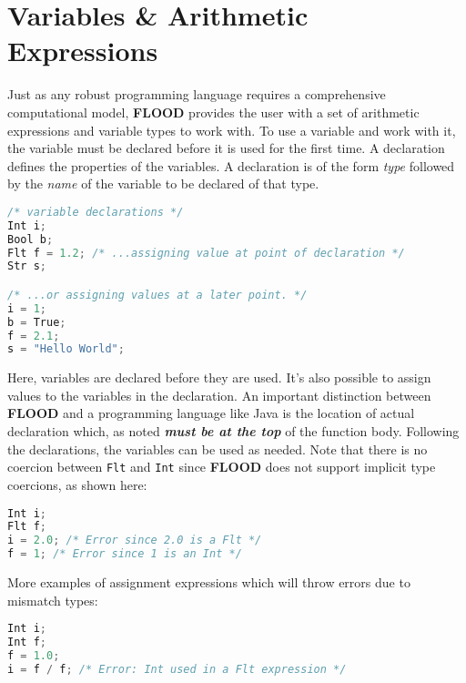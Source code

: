 \documentclass[12pt]{report}
\begin{document}
\section{Variables \& Arithmetic Expressions}

Just as any robust programming language requires a comprehensive computational model, \textbf{FLOOD} provides the user with a set of arithmetic expressions and variable types to work with. To use a variable and work with it, the variable must be declared before it is used for the first time. A declaration defines the properties of the variables. A declaration is of the form \textit{type} followed by the \textit{name} of the variable to be declared of that type.

\begin{singlespace}
\begin{lstlisting}[language=Java,label=some-code,caption=Variable declarations]
/* variable declarations */
Int i;
Bool b;
Flt f = 1.2; /* ...assigning value at point of declaration */
Str s;

/* ...or assigning values at a later point. */
i = 1;
b = True;
f = 2.1;
s = "Hello World";
\end{lstlisting}
\end{singlespace}

Here, variables are declared before they are used. It's also possible to assign values to the variables in the declaration. An important distinction between \textbf{FLOOD} and a programming language like Java is the location of actual declaration which, as noted \textit{\textbf{must be at the top}} of the function body. Following the declarations, the variables can be used as needed. Note that there is no coercion between \texttt{Flt} and \texttt{Int} since \textbf{FLOOD} does not support implicit type coercions, as shown here:

\begin{singlespace}
\begin{lstlisting}[language=Java,label=some-code,caption=Implicit type coersion is not supported]
Int i;
Flt f;
i = 2.0; /* Error since 2.0 is a Flt */
f = 1; /* Error since 1 is an Int */
\end{lstlisting}
\end{singlespace}

More examples of assignment expressions which will throw errors due to mismatch types:

\begin{singlespace}
\begin{lstlisting}[language=Java,label=some-code,caption=More errors due to mistmatch type declarations and assignments]
Int i;
Int f;
f = 1.0;
i = f / f; /* Error: Int used in a Flt expression */
\end{lstlisting}
\end{singlespace}
\end{document}
